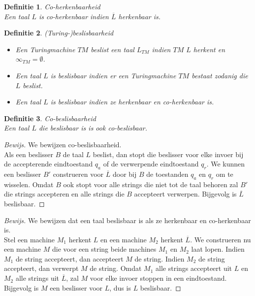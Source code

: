 \documentclass[a4paper]{article}
\newtheorem{tdefinitie}{Definitie}[section]
\newenvironment{definitie}[1]%
  {\begin{mdframed}[backgroundcolor=silver,
    topline=false,
    rightline=false,
    leftline=false,
    bottomline=false]\begin{tdefinitie}#1\\\normalfont}%
  {\end{tdefinitie}\end{mdframed}}
\newenvironment{bewijs}[1]%
  {\begin{mdframed}[topline=true,
    rightline=true,
    leftline=true,
    bottomline=true]\begin{proof}[Bewijs]#1\\[.2cm]\normalfont}%
  {\end{proof}\end{mdframed}}
\begin{document}
\begin{definitie}{Co-herkenbaarheid}
  Een taal $L$ is co-herkenbaar indien $\overline{L}$ herkenbaar is.
\end{definitie}

\begin{definitie}{(Turing-)beslisbaarheid}
  \vspace{-5mm}\begin{itemize}
  \item Een Turingmachine $TM$ beslist een taal $L_{TM}$ indien $TM$ $L$ herkent en $\infty_{TM} = \emptyset$.
  \item Een taal $L$ is beslisbaar indien er een Turingmachine $TM$ bestaat zodanig die $L$ beslist.
  \item Een taal $L$ is beslisbaar indien ze herkenbaar en co-herkenbaar is.
  \end{itemize}
\end{definitie}

\begin{definitie}{Co-beslisbaarheid}
  Een taal $L$ die beslisbaar is is ook co-beslisbaar.
\end{definitie}

\begin{bewijs}{We bewijzen co-beslisbaarheid.}
  Als een beslisser $B$ de taal $L$ beslist, dan stopt die beslisser voor elke invoer bij de accepterende eindtoestand $q_a$ of de verwerpende eindtoestand $q_r$. We kunnen een beslisser $B'$ construeren voor $\overline{L}$ door bij $B$ de toestanden $q_a$ en $q_r$ om te wisselen. Omdat $B$ ook stopt voor alle strings die niet tot de taal behoren zal $B'$ die strings accepteren en alle strings die $B$ accepteert verwerpen. Bijgevolg is $\overline{L}$ beslisbaar.
\end{bewijs}

\begin{bewijs}{We bewijzen dat een taal beslisbaar is als ze herkenbaar en co-herkenbaar is.}
  Stel een machine $M_1$ herkent $L$ en een machine $M_2$ herkent $\overline{L}$. We construeren nu een machine $M$ die voor een string beide machines $M_1$ en $M_2$ laat lopen. Indien $M_1$ de string accepteert, dan accepteert $M$ de string. Indien $M_2$ de string accepteert, dan verwerpt $M$ de string. Omdat $M_1$ alle strings accepteert uit $L$ en $M_2$ alle strings uit $\overline{L}$, zal $M$ voor elke invoer stoppen in een eindtoestand. Bijgevolg is $M$ een beslisser voor $L$, dus is $L$ beslisbaar.
\end{bewijs}
\end{document}
